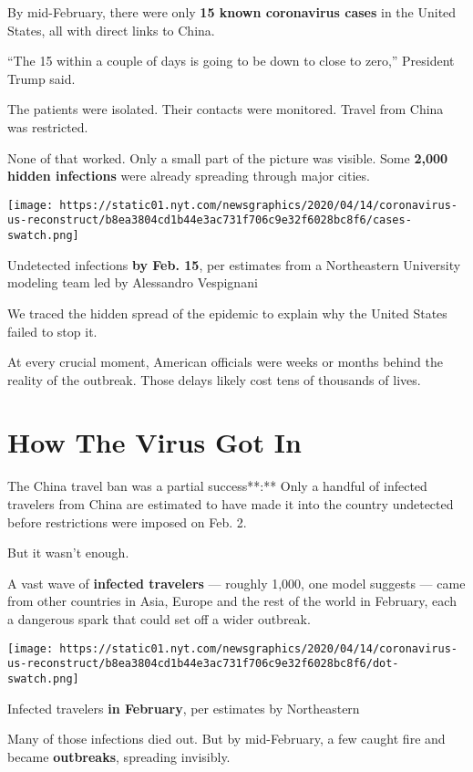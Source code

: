 By mid-February, there were only \textbf{15 known coronavirus cases} in
the United States, all with direct links to China.

``The 15 within a couple of days is going to be down to close to zero,''
President Trump said.

The patients were isolated. Their contacts were monitored. Travel from
China was restricted.

None of that worked. Only a small part of the picture was visible. Some
\textbf{2,000 hidden infections} were already spreading through major
cities.

\texttt{[image: https://static01.nyt.com/newsgraphics/2020/04/14/coronavirus-us-reconstruct/b8ea3804cd1b44e3ac731f706c9e32f6028bc8f6/cases-swatch.png]}

Undetected infections \textbf{by Feb. 15}, per estimates from a
Northeastern University modeling team led by Alessandro Vespignani

We traced the hidden spread of the epidemic to explain why the United
States failed to stop it.

At every crucial moment, American officials were weeks or months behind
the reality of the outbreak. Those delays likely cost tens of thousands
of lives.

\hypertarget{how-the-virus-got-in}{%
\section{How The Virus Got In}\label{how-the-virus-got-in}}

The China travel ban was a partial success**:** Only a handful of
infected travelers from China are estimated to have made it into the
country undetected before restrictions were imposed on Feb. 2.

But it wasn't enough.

A vast wave of \textbf{infected travelers} --- roughly 1,000, one model
suggests --- came from other countries in Asia, Europe and the rest of
the world in February, each a dangerous spark that could set off a wider
outbreak.

\texttt{[image: https://static01.nyt.com/newsgraphics/2020/04/14/coronavirus-us-reconstruct/b8ea3804cd1b44e3ac731f706c9e32f6028bc8f6/dot-swatch.png]}

Infected travelers \textbf{in February}, per estimates by Northeastern

Many of those infections died out. But by mid-February, a few caught
fire and became \textbf{outbreaks}, spreading invisibly.


